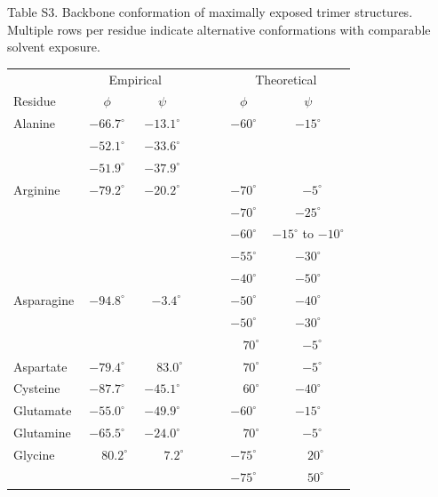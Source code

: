 \documentclass[12pt]{article}
\begin{document}
\newpage
\noindent Table S3. Backbone conformation of maximally exposed trimer structures. Multiple rows per residue indicate alternative conformations with comparable solvent exposure.


\begin{center}
\footnotesize
\begin{tabular}{lccccc}
&  \multicolumn{2}{c}{Empirical} & ~~~& \multicolumn{2}{c}{Theoretical}\\\cline{2-3}\cline{5-6}
Residue & $\phi$ & $\psi$ & & $\phi$ & $\psi$ \\
\hline Alanine   & $-66.7^{\circ}$ & $-13.1^{\circ}$ & & $-60^{\circ}$ & $-15^{\circ}$\\
                 & $-52.1^{\circ}$ & $-33.6^{\circ}$ & &\\
                 & $-51.9^{\circ}$ & $-37.9^{\circ}$ & &\\
Arginine         & $-79.2^{\circ}$ & $-20.2^{\circ}$ & & $-70^{\circ}$ & ~\,$-5^{\circ}$ \\
		 &	&	& & $-70^{\circ}$ & $-25^{\circ}$\\
		 &	&	& & $-60^{\circ}$ & $-15^{\circ}$ to $-10^{\circ}$\\
		 &	&	& & $-55^{\circ}$ & $-30^{\circ}$\\
                 &      &       & & $-40^{\circ}$ & $-50^{\circ}$\\      
Asparagine       & $-94.8^{\circ}$ & ~\,$-3.4^{\circ}$ & & $-50^{\circ}$ & $-40^{\circ}$ \\
                 &      &       & & $-50^{\circ}$ & $-30^{\circ}$\\
		 &      &       & & $\phantom{-}70^{\circ}$ & ~\,$-5^{\circ}$\\
Aspartate        & $-79.4^{\circ}$ & $\phantom{-}83.0^{\circ}$ & & $\phantom{-}70^{\circ}$ & ~\,$-5^{\circ}$ \\
Cysteine         & $-87.7^{\circ}$ & $-45.1^{\circ}$ & & $\phantom{-}60^{\circ}$ & $-40^{\circ}$ \\
Glutamate        & $-55.0^{\circ}$ & $-49.9^{\circ}$ & & $-60^{\circ}$ & $-15^{\circ}$\\
Glutamine        & $-65.5^{\circ}$ & $-24.0^{\circ}$ & & $\phantom{-}70^{\circ}$ & ~\,$-5^{\circ}$\\
Glycine          & $\phantom{-}80.2^{\circ}$ & ~\,$\phantom{-}7.2^{\circ}$ & & $-75^{\circ}$ & $\phantom{-}20^{\circ}$  \\
                 &      &       & & $-75^{\circ}$ & $\phantom{-}50^{\circ}$\\

\end{tabular}
\end{center}
\end{document}
